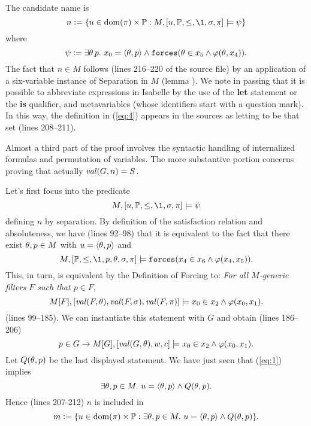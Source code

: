 The candidate name is
\begin{equation}\label{eq:4}
n \defi \{u \in\dom(\pi)\times\PP :M,[u,\PP,\leq,\1,\sig,\pi]\models \psi\}
\end{equation}
where
\[
\psi \mathrel{\mathop:}= \exists \theta\, p.\ x_0=\langle\theta,p\rangle \wedge 
   \mathop{\mathtt{forces}}(\theta\in x_5\wedge\varphi(\theta,x_4)).
\]
The fact that $n\in M$ follows (lines 216--220 of the source file) by
an application of a six-variable instance of Separation in $M$ (lemma
). We note in
passing that it is possible to  abbreviate expressions in Isabelle by
the use of the  \textbf{let} statement or the \textbf{is} qualifier,
and metavariables (whose
identifiers start with a question mark). In this way, the definition in
(\ref{eq:4}) appears in the sources as letting  to be that
set (lines 208--211).

Almost a third part of the proof involves the syntactic handling of
internalized formulas and permutation of variables. The more
substantive portion concerns proving that actually $\operatorname{\mathit{val}}(G,n)=S$.

Let's first focus into the predicate 
\begin{equation}\label{eq:1}
M,[u,\PP,\leq,\1,\sig,\pi]\models \psi
\end{equation}
defining $n$ by separation. By definition of the satisfaction
relation and %
absoluteness, we have (lines 92--98) that it is equivalent to the fact
that there exist $\theta,p\in M$ with   $u=\langle\theta,p\rangle$  and 
\[
M,[\PP,\leq,\1,p,\th,\sig,\pi]\models \forceisa(x_4\in
x_6\y\phi(x_4,x_5)). 
\]
This, in turn, is equivalent by the Definition of Forcing to: \emph{For all $M$-generic
filters $F$ such that $p\in F$,} 
\begin{equation}\label{eq:2}
M[F],[\val(F,\th),\val(F,\sig),\val(F,\pi)]\models x_0\in
x_2\y\phi(x_0,x_1). 
\end{equation}
(lines 99--185). We can instantiate this statement with $G$ and obtain
(lines 186--206)
\[
p\in G \rightarrow M[G],[\operatorname{\mathit{val}}(G,\theta),w,c]\models x_0\in
x_2\wedge\varphi(x_0,x_1). 
\] 
Let $Q(\theta,p)$ be the last displayed statement. We have just seen that
(\ref{eq:1}) implies 
\[
\exists \theta,p\in M.\ u=\langle\theta,p\rangle \wedge Q(\theta,p).
\]
Hence (lines 207-212) $n$ is included in 
\[
m\mathrel{\mathop:}= \{u \in\operatorname{dom}(\pi)\times\mathbb{P} : \exists \theta,p\in M.\ u=\langle\theta,p\rangle
\wedge Q(\theta,p)\}. 
\]

\medskip

